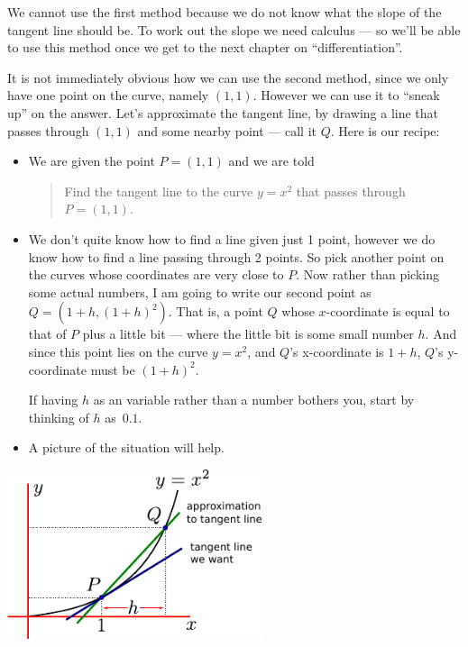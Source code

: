 We cannot use the first method because we do not know what the slope of the
tangent line should be. To work out the slope we need calculus --- so we'll
be able to use this method once we get to the next chapter on
``differentiation''.

It is not immediately obvious how we can use the second method, since we only
have one point on the curve, namely $(1,1)$. However we can use it to ``sneak
up'' on the answer.  Let's approximate the tangent line, by drawing a line that
passes through $(1,1)$ and some nearby point --- call it $Q$. Here is our
recipe:
\begin{itemize}
 \item We are given the point $P=(1,1)$ and we are told
\begin{quote}
Find the tangent line to the curve $y=x^2$ that passes through $P = (1,1)$.
\end{quote}
 \item We don't quite know how to find a line given just 1 point, however we do
know how to find a line passing through 2 points. So pick another point on the
curves whose coordinates are very close to $P$. Now rather than picking some
actual numbers, I am going to write our second point as $Q = (1+h, (1+h)^2)$.
That is, a point $Q$ whose $x$-coordinate is equal to that of $P$ plus a little
bit --- where the little bit is some small number $h$.  And since this point
lies on the curve $y=x^2$, and $Q$'s x-coordinate is $1+h$, $Q$'s y-coordinate must
be $(1+h)^2$.

If having $h$ as an variable rather than a number bothers you, start by
thinking of $h$ as~$0.1$.

 \item A picture of the situation will help.
\end{itemize}
\begin{fig}
  \begin{center}
  \includegraphics[height=5cm]{tang2}
  \end{center}
\end{fig}
